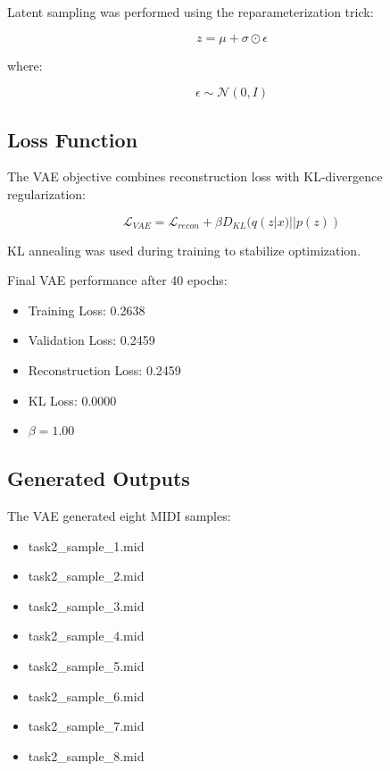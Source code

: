 \documentclass[conference]{IEEEtran}
\begin{document}
Latent sampling was performed using the reparameterization trick:

\begin{equation}
z = \mu + \sigma \odot \epsilon
\end{equation}

where:

\begin{equation}
\epsilon \sim \mathcal{N}(0, I)
\end{equation}

\subsection{Loss Function}
The VAE objective combines reconstruction loss with KL-divergence regularization:

\begin{equation}
\mathcal{L}_{VAE} = \mathcal{L}_{recon} + \beta D_{KL}(q(z|x)||p(z))
\end{equation}

KL annealing was used during training to stabilize optimization.

Final VAE performance after 40 epochs:

\begin{itemize}
    \item Training Loss: 0.2638
    \item Validation Loss: 0.2459
    \item Reconstruction Loss: 0.2459
    \item KL Loss: 0.0000
    \item $\beta = 1.00$
\end{itemize}

\subsection{Generated Outputs}
The VAE generated eight MIDI samples:

\begin{itemize}
    \item task2\_sample\_1.mid
    \item task2\_sample\_2.mid
    \item task2\_sample\_3.mid
    \item task2\_sample\_4.mid
    \item task2\_sample\_5.mid
    \item task2\_sample\_6.mid
    \item task2\_sample\_7.mid
    \item task2\_sample\_8.mid
\end{itemize}
\end{document}
